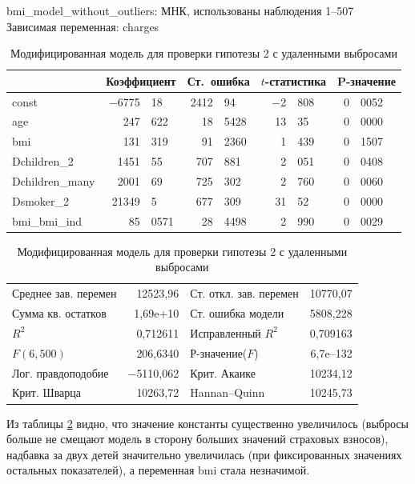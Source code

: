 \documentclass[a4paper,12pt]{article}
\begin{document}
\begin{table}[H]
\begin{center}
	bmi\_model\_without\_outliers:
	МНК, использованы наблюдения 1--507\\
	Зависимая переменная: charges\\
	\vspace{1em}
	\begin{tabular}{|l|r@{,}l|r@{,}l|r@{,}l|r@{,}l|}
		\hline
		&
		\multicolumn{2}{c|}{Коэффициент} &
		\multicolumn{2}{c|}{Ст.\ ошибка} &
		\multicolumn{2}{c|}{$t$-статистика} &
		\multicolumn{2}{c|}{P-значение} \\[1ex] \hline
		const &	$-$6775&18 & 2412&94 & $-$2&808 & 0&0052 \\ \hline
		age & 247&622 & 18&5428 & 13&35 & 0&0000 \\ \hline
		bmi & 131&319 & 91&2360 & 1&439 & 0&1507 \\ \hline
		Dchildren\_2 & 1451&55 & 707&881 & 2&051 & 0&0408 \\ \hline
		Dchildren\_many & 2001&69 & 725&302 & 2&760 & 0&0060 \\ \hline
		Dsmoker\_2 & 21349&5 & 677&309 & 31&52 & 0&0000 \\ \hline
		bmi\_bmi\_ind & 85&0571 & 28&4498 & 2&990 &	0&0029 \\ \hline
	\end{tabular}
	\vspace{1ex}
	\begin{tabular}{lrlr}
		Среднее зав. перемен &  12523,96 & Ст. откл. зав. перемен &  10770,07 \\
		Сумма кв. остатков &  1,69\textrm{e+10} & Ст. ошибка модели &  5808,228 \\
		$R^2$ &  0,712611 & Исправленный $R^2$ &  0,709163 \\
		$F(6, 500)$ &  206,6340 & Р-значение($F$) &  6,7\textrm{e--132} \\
		Лог. правдоподобие & $-$5110,062 & Крит. Акаике &  10234,12 \\
		Крит. Шварца &  10263,72 & Hannan--Quinn &  10245,73 \\
	\end{tabular}
\caption{Модифицированная модель для проверки гипотезы 2 с удаленными выбросами}
\label{model-out}
\end{center}
\end{table}

Из таблицы \ref{model-out} видно, что значение константы существенно увеличилось (выбросы больше не смещают модель в сторону больших значений страховых взносов), надбавка за двух детей значительно увеличилась (при фиксированных значениях остальных показателей), а переменная bmi стала незначимой.
\end{document}
